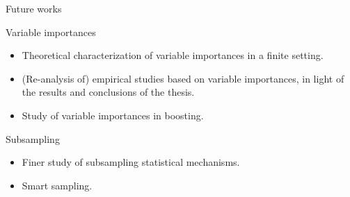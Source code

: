 \documentclass{beamer}
\begin{document}
\begin{frame}{Future works}

\begin{block}{Variable importances}
\begin{itemize}
\item Theoretical characterization of variable importances in a finite setting.
\item (Re-analysis of) empirical studies based on variable importances, in light
of the results and conclusions of the thesis.
\item Study of variable importances in boosting.
\end{itemize}
\end{block}

\begin{block}{Subsampling}
\begin{itemize}
\item Finer study of subsampling statistical mechanisms.
\item Smart sampling.
\end{itemize}
\end{block}

\end{frame}
\end{document}
